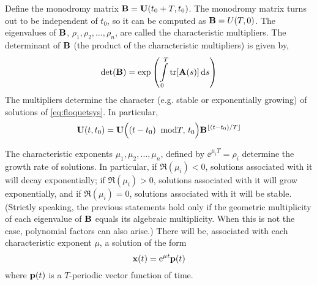 \documentclass[10pt,letter, swedish, english,%
]{article}
\begin{document}
\bigskip
\noindent
Define the monodromy matrix $\vb{B}=\vb{U}({t}_{0}+T,{t}_{0})$. The monodromy
matrix turns out to be independent of  ${t}_{0}$, so it can be
computed as  $\vb{B}={U}(T,0)$. The eigenvalues of  $\vb{B}$,  $\rho_{1},\rho_{2},{\dots},\rho_{n}$, are called the characteristic
multipliers. The determinant of  $\vb{B}$ (the product of the
characteristic multipliers) is given by, 
\begin{equation}
\det(\vb{B})=\exp \left(
\int_{0}^{T}{\tr[\vb{A}(s)]\id{s}}
\right)
\end{equation}
The multipliers determine the character (e.g. stable or exponentially
growing) of solutions of \eqref{eq:floquetsys}. In particular, 
\begin{equation}
\vb{U}(t,{t}_{0})=
\vb{U}\Big((t-{t}_{0})\;\;\text{mod} T,\,{t}_{0}\Big)
{\vb{B}}^{\lfloor(t-{t}_{0})/T\rfloor}
\end{equation}

The characteristic exponents  
$\mu_{1},\mu_{2},{\ldots},\mu_{n}$, defined by  $\ee^{\mu_{i}T}=\rho_{i}$ determine the
growth rate of solutions. In particular, if  $\Re(\mu_{i})<0$,
solutions associated with it will decay exponentially; if
$\Re(\mu_{i})>0$, solutions associated with it will grow
exponentially, and if  $\Re(\mu_{i})=0$, solutions 
associated with it will be stable. (Strictly speaking, the previous
statements hold only if the geometric multiplicity of each eigenvalue
of  $\vb{B}$ equals its algebraic multiplicity. When this is not the case,
polynomial factors can also arise.) There will be, associated with
each characteristic exponent  $\mu$, a solution of the form 
\begin{equation}
\vb{x}(t)=\mathrm{e}^{\mathit{\mu t}}\vb{p}(t)
\end{equation}
where  $\vb{p}(t)$ is a  $T$-periodic vector function of time. 
\end{document}
